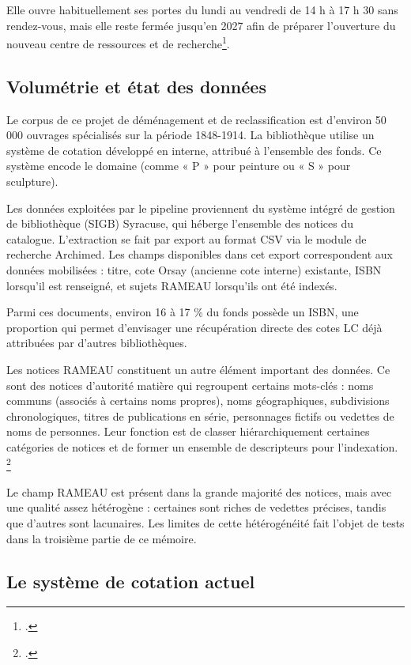 Elle ouvre habituellement ses portes du lundi au vendredi de 14 h à 17 h 30 sans rendez-vous, mais elle reste fermée jusqu'en 2027 afin de préparer l'ouverture du nouveau centre de ressources et de recherche\footcite{ccfr}.



\subsection{Volumétrie et état des données}

Le corpus de ce projet de déménagement et de reclassification est d'environ 50 000 ouvrages spécialisés sur la période 1848-1914.
La bibliothèque utilise un système de cotation développé en interne, attribué à l'ensemble des fonds. Ce système encode le domaine (comme « P » pour peinture ou « S » pour sculpture).

Les données exploitées par le pipeline proviennent du système intégré de gestion de bibliothèque (SIGB) Syracuse, qui héberge l’ensemble des notices du catalogue. L’extraction se fait par export au format CSV via le module de recherche Archimed. Les champs disponibles dans cet export correspondent aux données mobilisées : titre, cote Orsay (ancienne cote interne) existante, ISBN lorsqu’il est renseigné, et sujets RAMEAU lorsqu’ils ont été indexés.

Parmi ces documents, environ 16 à 17 \% du fonds possède un ISBN, une proportion qui permet d'envisager une récupération directe des cotes LC déjà attribuées par d'autres bibliothèques.

Les notices RAMEAU constituent un autre élément important des données. Ce sont des notices d'autorité matière qui regroupent certains mots-clés : noms communs (associés à certains noms propres), noms géographiques, subdivisions chronologiques, titres de publications en série, personnages fictifs ou vedettes de noms de personnes. Leur fonction est de classer hiérarchiquement certaines catégories de notices et de former un ensemble de descripteurs pour l'indexation. \footcite{rameaubnf}

Le champ RAMEAU est présent dans la grande majorité des notices, mais avec une qualité assez hétérogène : certaines sont riches de vedettes précises, tandis que d'autres sont lacunaires. Les limites de cette hétérogénéité fait l'objet de tests dans la troisième partie de ce mémoire.



\subsection{Le système de cotation actuel}

